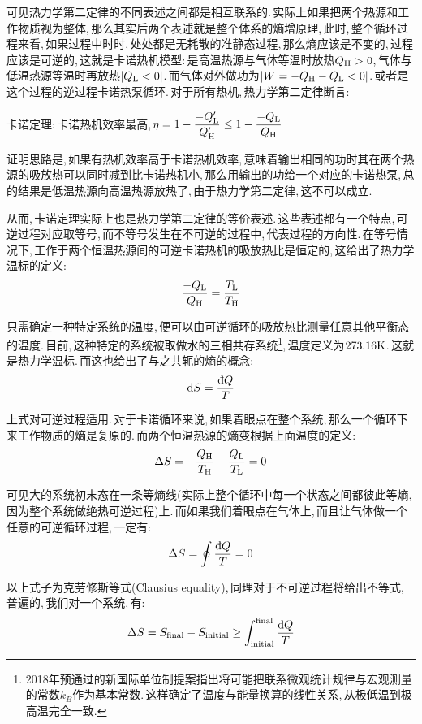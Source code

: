 可见热力学第二定律的不同表述之间都是相互联系的.\,实际上如果把两个热源和工作物质视为整体,\,那么其实后两个表述就是整个体系的熵增原理,\,此时,\,整个循环过程来看,\,如果过程中时时,\,处处都是无耗散的准静态过程,\,那么熵应该是不变的,\,过程应该是可逆的,\,这就是卡诺热机模型:\,是高温热源与气体等温时放热$Q_{\rm H}>0$,\,气体与低温热源等温时再放热$|Q_{\rm L}<0|$.\,而气体对外做功为$|W=-Q_{\rm H}-Q_{\rm L}<0|$.\,或者是这个过程的逆过程\ca 卡诺热泵循环.\,对于所有热机,\,热力学第二定律断言:

\begin{center}
\hei 卡诺定理:\,卡诺热机效率最高,\,$\displaystyle \eta=1-\frac{-Q_{\rm L}^\prime}{Q_{\rm H}^\prime}\leq 1-\frac{-Q_{\rm L}}{Q_{\rm H}}$
\end{center}

证明思路是,\,如果有热机效率高于卡诺热机效率,\,意味着输出相同的功时其在两个热源的吸放热可以同时减到比卡诺热机小,\,那么用输出的功给一个对应的卡诺热泵,\,总的结果是低温热源向高温热源放热了,\,由于热力学第二定律,\,这不可以成立.

从而,\,卡诺定理实际上也是热力学第二定律的等价表述.\,这些表述都有一个特点,\,可逆过程对应取等号,\,而不等号发生在不可逆的过程中,\,代表过程的方向性.\,在等号情况下,\,工作于两个恒温热源间的可逆卡诺热机的吸放热比是恒定的,\,这给出了热力学温标的定义:
\[\frac{-Q_{\rm L}}{Q_{\rm H}}=\frac{T_{\rm L}}{T_{\rm H}}\]

只需确定一种特定系统的温度,\,便可以由可逆循环的吸放热比测量任意其他平衡态的温度.\,目前,\,这种特定的系统被取做水的三相共存系统\footnote{2018年预通过的新国际单位制提案指出将可能把联系微观统计规律与宏观测量的常数$k_B$作为基本常数.\,这样确定了温度与能量换算的线性关系,\,从极低温到极高温完全一致.},\,温度定义为$273.16{\rm K}$.\,这就是热力学温标.\,而这也给出了与之共轭的熵的概念:
\[\ud S=\frac{\dbar Q}{T}\]

上式对可逆过程适用.\,对于卡诺循环来说,\,如果着眼点在整个系统,\,那么一个循环下来工作物质的熵是复原的.\,而两个恒温热源的熵变根据上面温度的定义:
\[\Delta S=-\frac{Q_{\rm H}}{T_{\rm H}}-\frac{Q_{\rm L}}{T_{\rm L}}=0\]

可见大的系统初末态在一条等熵线(实际上整个循环中每一个状态之间都彼此等熵,\,因为整个系统做绝热可逆过程)上.\,而如果我们着眼点在气体上,\,而且让气体做一个任意的可逆循环过程,\,一定有:
\[\Delta S=\oint \frac{\dbar Q}{T}=0\]

以上式子为克劳修斯等式(Clausius equality),\,同理对于不可逆过程将给出不等式,\,普遍的,\,我们对一个系统,\,有:
\[\Delta S=S_{\rm final}-S_{\rm initial}\geq \int_{\rm initial}^{\rm final}\frac{\dbar Q}{T}\]

